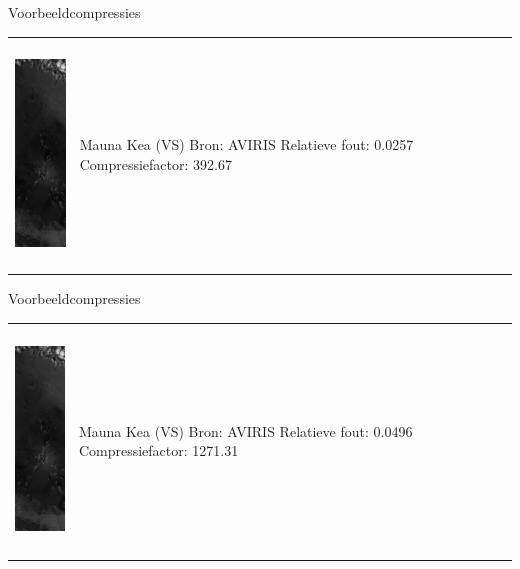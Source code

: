 \documentclass[t,12pt,dutch
\ifx\beamermode\undefined\else,\beamermode\fi
]{beamer}
\begin{document}
\begin{frame}{Voorbeeldcompressies}

\begin{table}[H]
\centering
\begin{tabular}{C{0.6\textwidth}  L{0.4\textwidth}}
\includegraphics[height=6cm]{images/example_compression_Mauna_Kea_0_025.png}
&
Mauna Kea (VS)\newline
Bron: AVIRIS \cite{ref:aviris}\newline
\vspace{5mm}
Relatieve fout: 0.0257
Compressiefactor: 392.67
\end{tabular}
\end{table}

\end{frame}

\begin{frame}{Voorbeeldcompressies}

\begin{table}[H]
\centering
\begin{tabular}{C{0.6\textwidth}  L{0.4\textwidth}}
\includegraphics[height=6cm]{images/example_compression_Mauna_Kea_0_05.png}
&
Mauna Kea (VS)\newline
Bron: AVIRIS \cite{ref:aviris}\newline
\vspace{5mm}
Relatieve fout: 0.0496
Compressiefactor: 1271.31
\end{tabular}
\end{table}

\end{frame}
\end{document}
